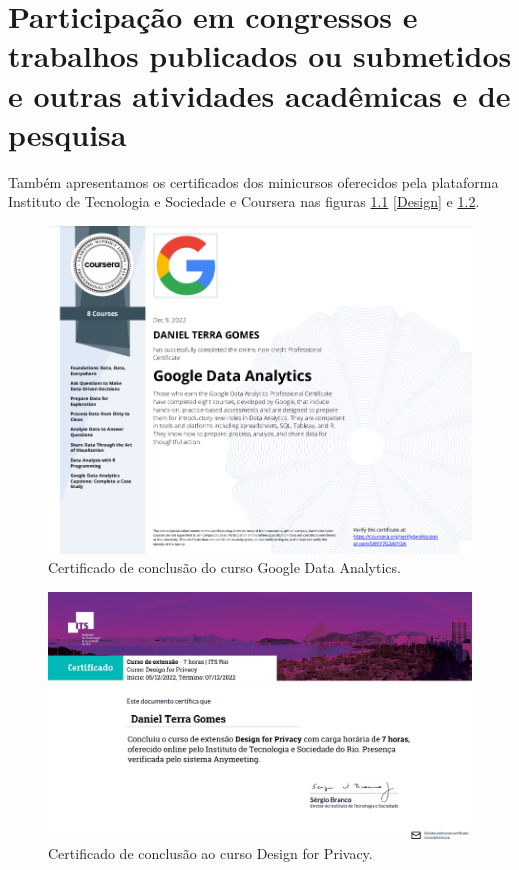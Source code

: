\chapter{Participação em congressos e trabalhos publicados ou submetidos e outras
atividades acadêmicas e de pesquisa} \label{eventos}

Também apresentamos os certificados dos minicursos oferecidos pela plataforma Instituto de Tecnologia e Sociedade e Coursera  nas figuras \ref{Google} \ref{Design} e \ref{Direitos}.


\begin{figure}[H]
\centering
\includegraphics[width=\textwidth]{Figures/google.png}
\caption{Certificado de conclusão do curso Google Data Analytics.}
\label{Google}
\end{figure}

\begin{figure}[H]
\centering
\includegraphics[width=\textwidth]{Figures/its2.pdf}
\caption{Certificado de conclusão ao curso Design for Privacy.}
\label{Direitos}
\end{figure}

